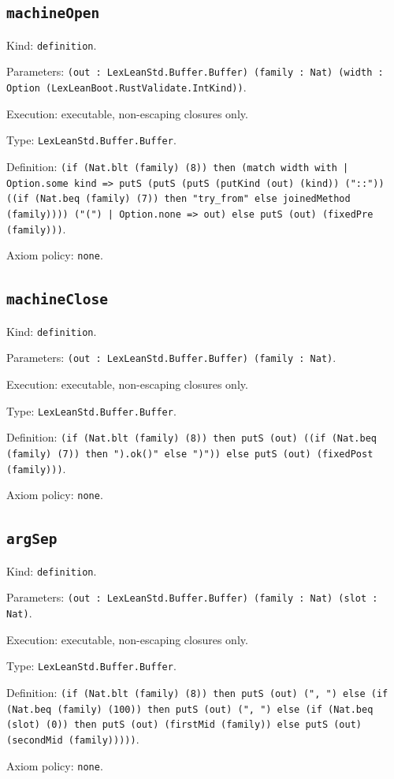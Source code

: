 \documentclass[11pt]{article}
\begin{document}
\subsection*{\texttt{machineOpen}}
\noindent Kind: \texttt{definition}.\par
\noindent Parameters: \texttt{(out : LexLeanStd.Buffer.Buffer) (family : Nat) (width : Option (LexLeanBoot.RustValidate.IntKind))}.\par
\noindent Execution: executable, non-escaping closures only.\par
\noindent Type: \texttt{LexLeanStd.Buffer.Buffer}.\par
\noindent Definition: \texttt{(if (Nat.blt (family) (8)) then (match width with | Option.some kind => putS (putS (putS (putKind (out) (kind)) ("::")) ((if (Nat.beq (family) (7)) then "try\_from" else joinedMethod (family)))) ("(") | Option.none => out) else putS (out) (fixedPre (family)))}.\par
\noindent Axiom policy: \texttt{none}.\par
\subsection*{\texttt{machineClose}}
\noindent Kind: \texttt{definition}.\par
\noindent Parameters: \texttt{(out : LexLeanStd.Buffer.Buffer) (family : Nat)}.\par
\noindent Execution: executable, non-escaping closures only.\par
\noindent Type: \texttt{LexLeanStd.Buffer.Buffer}.\par
\noindent Definition: \texttt{(if (Nat.blt (family) (8)) then putS (out) ((if (Nat.beq (family) (7)) then ").ok()" else ")")) else putS (out) (fixedPost (family)))}.\par
\noindent Axiom policy: \texttt{none}.\par
\subsection*{\texttt{argSep}}
\noindent Kind: \texttt{definition}.\par
\noindent Parameters: \texttt{(out : LexLeanStd.Buffer.Buffer) (family : Nat) (slot : Nat)}.\par
\noindent Execution: executable, non-escaping closures only.\par
\noindent Type: \texttt{LexLeanStd.Buffer.Buffer}.\par
\noindent Definition: \texttt{(if (Nat.blt (family) (8)) then putS (out) (", ") else (if (Nat.beq (family) (100)) then putS (out) (", ") else (if (Nat.beq (slot) (0)) then putS (out) (firstMid (family)) else putS (out) (secondMid (family)))))}.\par
\noindent Axiom policy: \texttt{none}.\par
\end{document}
